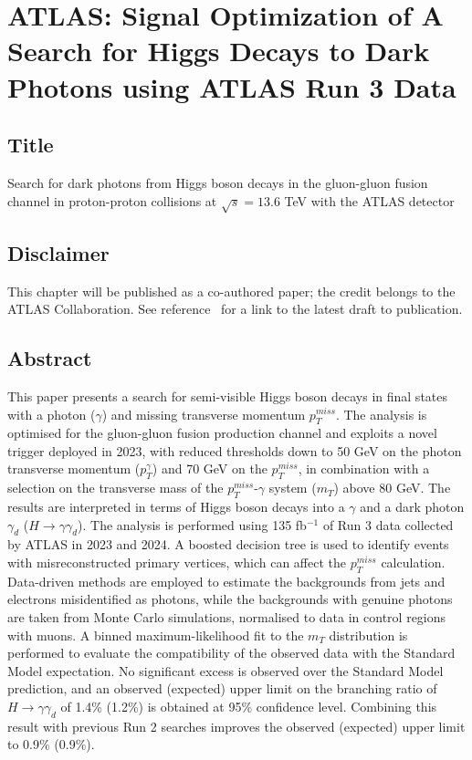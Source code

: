 \chapter{ATLAS: Signal Optimization of A Search for Higgs Decays to Dark Photons using ATLAS Run 3 Data}
\label{sec:darkphoton}
\section{Title}
Search for dark photons from Higgs boson decays in the gluon-gluon fusion channel in proton-proton collisions at $\sqrt{s}=13.6$ TeV with the ATLAS detector
\section{Disclaimer}
This chapter will be published as a co-authored paper; the credit belongs to the ATLAS Collaboration. See reference~\cite {ATLAS-HMBS-2024-50-002} for a link to the latest draft to publication.
\section{Abstract}
This paper presents a search for semi-visible Higgs boson decays in final states with a photon ($\gamma$) and missing transverse momentum $p_T^{miss}$.
The analysis is optimised for the gluon-gluon fusion production channel and exploits a novel trigger deployed in 2023, with reduced thresholds down to 50 GeV on the photon transverse momentum ($p_T^{\gamma}$) and 70 GeV on the $p_T^{miss}$, in combination with a selection on the transverse mass of the $p_T^{miss}$-$\gamma$ system ($m_T$) above 80 GeV. The results are interpreted in terms of Higgs boson decays into a $\gamma$ and a dark photon $\gamma_d$ ($H \to \gamma \gamma_d$).
The analysis is performed using 135 fb$^{-1}$ of Run 3 data collected by ATLAS in 2023 and 2024. A boosted decision tree is used to identify events with misreconstructed primary vertices, which can affect the $p_T^{miss}$ calculation. Data-driven methods are employed to estimate the backgrounds from jets and electrons misidentified as photons, while the backgrounds with genuine photons are taken from Monte Carlo simulations, normalised to data in control regions with muons. 
A binned maximum-likelihood fit to the $m_T$ distribution is performed to evaluate the compatibility of the observed data with the Standard Model expectation. No significant excess is observed over the Standard Model prediction, and an observed (expected) upper limit on the branching ratio of $H \to \gamma \gamma_d$ of 1.4\% (1.2\%) is obtained at 95\% confidence level. Combining this result with previous Run 2 searches improves the observed (expected) upper limit to 0.9\% (0.9\%).

